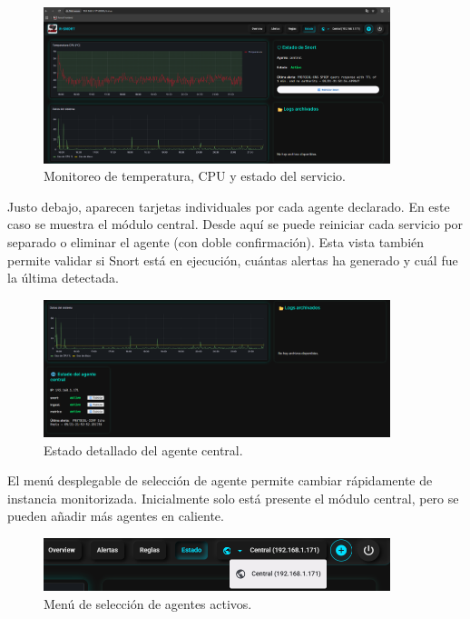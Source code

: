 \documentclass[11pt,a4paper,twoside]{report}
\begin{document}
\begin{figure}[H]
	\centering
	\includegraphics[width=0.9\textwidth]{configuracion/5.png}
	\caption{Monitoreo de temperatura, CPU y estado del servicio.}
	\label{fig:estado-central}
\end{figure}

Justo debajo, aparecen tarjetas individuales por cada agente declarado. En este caso se muestra el módulo central. Desde aquí se puede reiniciar cada servicio por separado o eliminar el agente (con doble confirmación). Esta vista también permite validar si Snort está en ejecución, cuántas alertas ha generado y cuál fue la última detectada.

\begin{figure}[H]
	\centering
	\includegraphics[width=0.9\textwidth]{configuracion/6.png}
	\caption{Estado detallado del agente central.}
	\label{fig:estado-agente-central}
\end{figure}

\newpage

El menú desplegable de selección de agente permite cambiar rápidamente de instancia monitorizada. Inicialmente solo está presente el módulo central, pero se pueden añadir más agentes en caliente.

\begin{figure}[H]
	\centering
	\includegraphics[width=0.9\textwidth]{configuracion/7.png}
	\caption{Menú de selección de agentes activos.}
	\label{fig:selector-agentes}
\end{figure}
\end{document}
